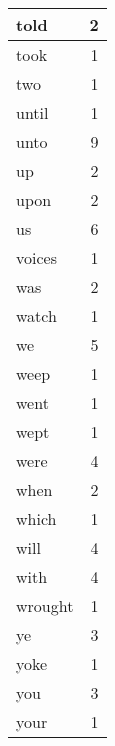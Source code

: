 \begin{center}
\begin{longtable}{l|r}
told & 2 \\ \hline
took & 1 \\ \hline
two & 1 \\ \hline
until & 1 \\ \hline
unto & 9 \\ \hline
up & 2 \\ \hline
upon & 2 \\ \hline
us & 6 \\ \hline
voices & 1 \\ \hline
was & 2 \\ \hline
watch & 1 \\ \hline
we & 5 \\ \hline
weep & 1 \\ \hline
went & 1 \\ \hline
wept & 1 \\ \hline
were & 4 \\ \hline
when & 2 \\ \hline
which & 1 \\ \hline
will & 4 \\ \hline
with & 4 \\ \hline
wrought & 1 \\ \hline
ye & 3 \\ \hline
yoke & 1 \\ \hline
you & 3 \\ \hline
your & 1 \\ \hline
\end{longtable}
\end{center}



\normalsize



